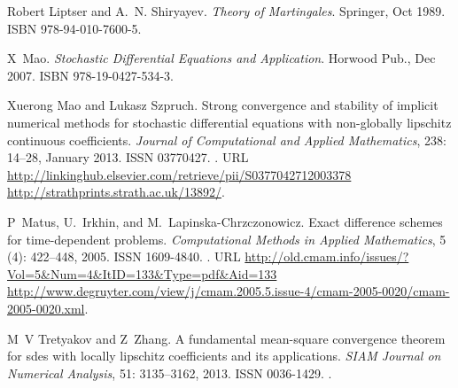 \documentclass[sort&compress, preprint]{elsarticle}
\theoremstyle{definition}
\theoremstyle{plain}%
\theoremstyle{remark}
\begin{document}
\begin{thebibliography}{17}
Robert Liptser and A.~N. Shiryayev.
\newblock \emph{Theory of Martingales}.
\newblock Springer, Oct 1989.
\newblock ISBN 978-94-010-7600-5.

X~Mao.
\newblock \emph{Stochastic Differential Equations and Application}.
\newblock Horwood Pub., Dec 2007.
\newblock ISBN 978-19-0427-534-3.

Xuerong Mao and Lukasz Szpruch.
\newblock Strong convergence and stability of implicit numerical methods for
  stochastic differential equations with non-globally lipschitz continuous
  coefficients.
\newblock \emph{Journal of Computational and Applied Mathematics},
  238: 14--28, January 2013.
\newblock ISSN 03770427.
\newblock {}.
\newblock URL
  \url{http://linkinghub.elsevier.com/retrieve/pii/S0377042712003378
  http://strathprints.strath.ac.uk/13892/}.

P~Matus, U.~Irkhin, and M.~Lapinska-Chrzczonowicz.
\newblock Exact difference schemes for time-dependent problems.
\newblock \emph{Computational Methods in Applied Mathematics}, 5
  (4): 422--448, 2005.
\newblock ISSN 1609-4840.
\newblock {}.
\newblock URL
  \url{http://old.cmam.info/issues/?Vol=5&Num=4&ItID=133&Type=pdf&Aid=133
  http://www.degruyter.com/view/j/cmam.2005.5.issue-4/cmam-2005-0020/cmam-2005-0020.xml}.

M~V Tretyakov and Z~Zhang.
\newblock A fundamental mean-square convergence theorem for sdes with locally
  lipschitz coefficients and its applications.
\newblock \emph{SIAM Journal on Numerical Analysis}, 51: 3135--3162,
  2013.
\newblock ISSN 0036-1429.
\newblock {}.

\end{thebibliography}
\appendix
\end{document}
